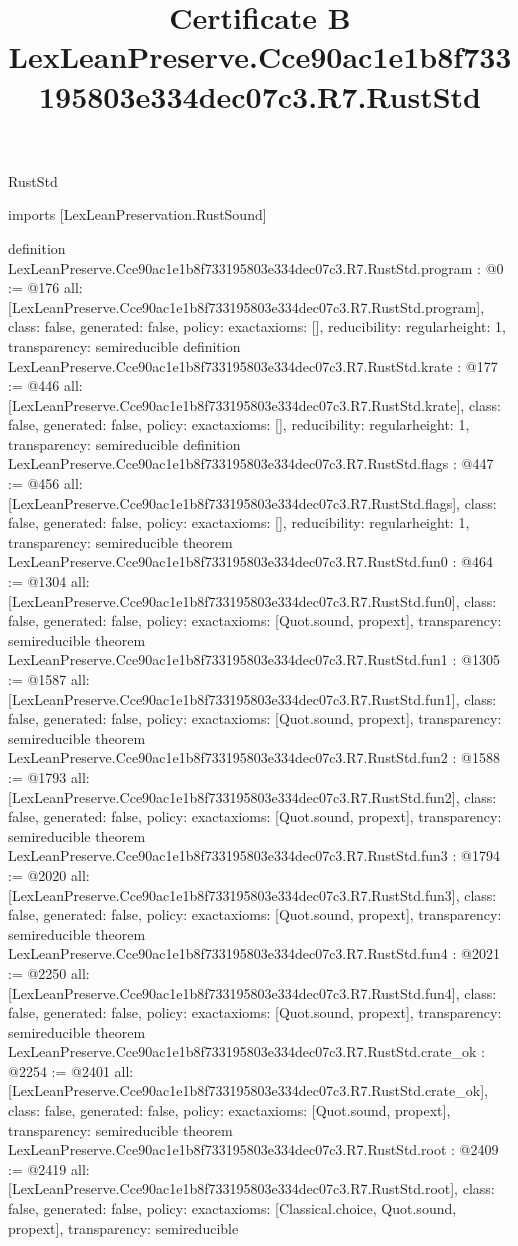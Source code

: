 \begin{lexlean}{RustStd}
\title{Certificate B LexLeanPreserve.Cce90ac1e1b8f733195803e334dec07c3.R7.RustStd}
\begin{coremodule}
imports [LexLeanPreservation.RustSound]

definition LexLeanPreserve.Cce90ac1e1b8f733195803e334dec07c3.R7.RustStd.program : @0 := @176 {
  all: [LexLeanPreserve.Cce90ac1e1b8f733195803e334dec07c3.R7.RustStd.program],
  class: false,
  generated: false,
  policy: exact{axioms: []},
  reducibility: regular{height: 1},
  transparency: semireducible
}
definition LexLeanPreserve.Cce90ac1e1b8f733195803e334dec07c3.R7.RustStd.krate : @177 := @446 {
  all: [LexLeanPreserve.Cce90ac1e1b8f733195803e334dec07c3.R7.RustStd.krate],
  class: false,
  generated: false,
  policy: exact{axioms: []},
  reducibility: regular{height: 1},
  transparency: semireducible
}
definition LexLeanPreserve.Cce90ac1e1b8f733195803e334dec07c3.R7.RustStd.flags : @447 := @456 {
  all: [LexLeanPreserve.Cce90ac1e1b8f733195803e334dec07c3.R7.RustStd.flags],
  class: false,
  generated: false,
  policy: exact{axioms: []},
  reducibility: regular{height: 1},
  transparency: semireducible
}
theorem LexLeanPreserve.Cce90ac1e1b8f733195803e334dec07c3.R7.RustStd.fun0 : @464 := @1304 {
  all: [LexLeanPreserve.Cce90ac1e1b8f733195803e334dec07c3.R7.RustStd.fun0],
  class: false,
  generated: false,
  policy: exact{axioms: [Quot.sound, propext]},
  transparency: semireducible
}
theorem LexLeanPreserve.Cce90ac1e1b8f733195803e334dec07c3.R7.RustStd.fun1 : @1305 := @1587 {
  all: [LexLeanPreserve.Cce90ac1e1b8f733195803e334dec07c3.R7.RustStd.fun1],
  class: false,
  generated: false,
  policy: exact{axioms: [Quot.sound, propext]},
  transparency: semireducible
}
theorem LexLeanPreserve.Cce90ac1e1b8f733195803e334dec07c3.R7.RustStd.fun2 : @1588 := @1793 {
  all: [LexLeanPreserve.Cce90ac1e1b8f733195803e334dec07c3.R7.RustStd.fun2],
  class: false,
  generated: false,
  policy: exact{axioms: [Quot.sound, propext]},
  transparency: semireducible
}
theorem LexLeanPreserve.Cce90ac1e1b8f733195803e334dec07c3.R7.RustStd.fun3 : @1794 := @2020 {
  all: [LexLeanPreserve.Cce90ac1e1b8f733195803e334dec07c3.R7.RustStd.fun3],
  class: false,
  generated: false,
  policy: exact{axioms: [Quot.sound, propext]},
  transparency: semireducible
}
theorem LexLeanPreserve.Cce90ac1e1b8f733195803e334dec07c3.R7.RustStd.fun4 : @2021 := @2250 {
  all: [LexLeanPreserve.Cce90ac1e1b8f733195803e334dec07c3.R7.RustStd.fun4],
  class: false,
  generated: false,
  policy: exact{axioms: [Quot.sound, propext]},
  transparency: semireducible
}
theorem LexLeanPreserve.Cce90ac1e1b8f733195803e334dec07c3.R7.RustStd.crate_ok : @2254 := @2401 {
  all: [LexLeanPreserve.Cce90ac1e1b8f733195803e334dec07c3.R7.RustStd.crate_ok],
  class: false,
  generated: false,
  policy: exact{axioms: [Quot.sound, propext]},
  transparency: semireducible
}
theorem LexLeanPreserve.Cce90ac1e1b8f733195803e334dec07c3.R7.RustStd.root : @2409 := @2419 {
  all: [LexLeanPreserve.Cce90ac1e1b8f733195803e334dec07c3.R7.RustStd.root],
  class: false,
  generated: false,
  policy: exact{axioms: [Classical.choice, Quot.sound, propext]},
  transparency: semireducible
}


\end{coremodule}
\end{lexlean}

